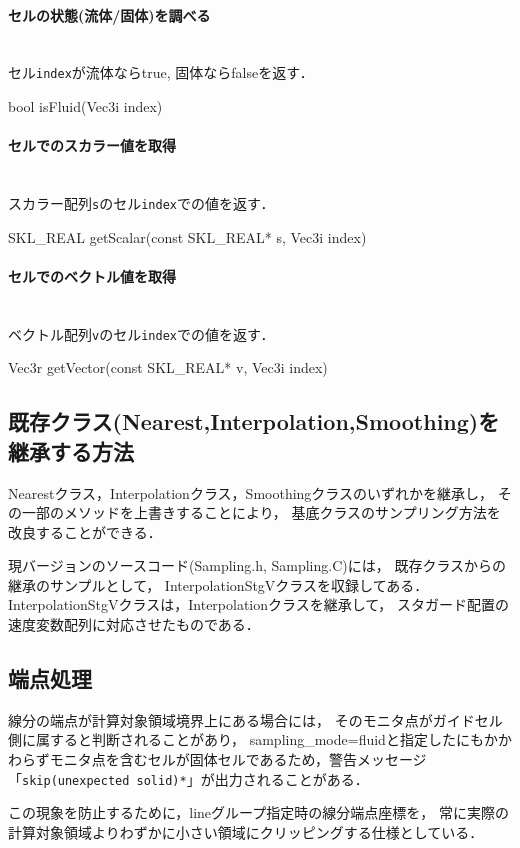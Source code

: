 %
\paragraph{セルの状態(流体/固体)を調べる}\mbox{}\\
セル{\tt index}が流体ならtrue, 固体ならfalseを返す．
{\small
\begin{program}
bool isFluid(Vec3i index)
\end{program}
}

%
\paragraph{セルでのスカラー値を取得}\mbox{}\\
スカラー配列{\tt s}のセル{\tt index}での値を返す．
{\small
\begin{program}
SKL_REAL getScalar(const SKL_REAL* s, Vec3i index)
\end{program}
}

%
\paragraph{セルでのベクトル値を取得}\mbox{}\\
ベクトル配列{\tt v}のセル{\tt index}での値を返す．
{\small
\begin{program}
Vec3r getVector(const SKL_REAL* v, Vec3i index)
\end{program}
}

\pagebreak
\subsection{既存クラス(Nearest,Interpolation,Smoothing)を継承する方法}
Nearestクラス，Interpolationクラス，Smoothingクラスのいずれかを継承し，
その一部のメソッドを上書きすることにより，
基底クラスのサンプリング方法を改良することができる．

現バージョンのソースコード(Sampling.h, Sampling.C)には，
既存クラスからの継承のサンプルとして，
InterpolationStgVクラスを収録してある．
InterpolationStgVクラスは，Interpolationクラスを継承して，
スタガード配置の速度変数配列に対応させたものである．


\subsection{端点処理}
線分の端点が計算対象領域境界上にある場合には，
そのモニタ点がガイドセル側に属すると判断されることがあり，
sampling\_mode=fluidと指定したにもかかわらずモニタ点を含むセルが固体セルであるため，警告メッセージ「{\tt  *skip(unexpected solid)*}」が出力されることがある．

この現象を防止するために，lineグループ指定時の線分端点座標を，
常に実際の計算対象領域よりわずかに小さい領域にクリッピングする仕様としている．


